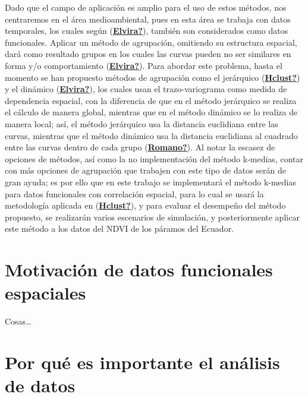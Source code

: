 \documentclass[
]{book}
\begin{document}
Dado que el campo de aplicación es amplio para el uso de estos métodos, nos centraremos en el área medioambiental, pues en esta área se trabaja con datos temporales, los cuales según (\protect\hyperlink{ref-Elvira}{\textbf{Elvira?}}), también son considerados como datos funcionales. Aplicar un método de agrupación, omitiendo su estructura espacial, dará como resultado grupos en los cuales las curvas pueden no ser similares en forma y/o comportamiento (\protect\hyperlink{ref-Elvira}{\textbf{Elvira?}}). Para abordar este problema, hasta el momento se han propuesto métodos de agrupación como el jerárquico (\protect\hyperlink{ref-Hclust}{\textbf{Hclust?}}) y el dinámico (\protect\hyperlink{ref-Elvira}{\textbf{Elvira?}}), los cuales usan el trazo-variograma como medida de dependencia espacial, con la diferencia de que en el método jerárquico se realiza el cálculo de manera global, mientras que en el método dinámico se lo realiza de manera local; así, el método jerárquico usa la distancia euclidiana entre las curvas, mientras que el método dinámico usa la distancia euclidiana al cuadrado entre las curvas dentro de cada grupo (\protect\hyperlink{ref-Romano}{\textbf{Romano?}}). Al notar la escasez de opciones de métodos, así como la no implementación del método k-medias, contar con más opciones de agrupación que trabajen con este tipo de datos serán de gran ayuda; es por ello que en este trabajo se implementará el método k-medias para datos funcionales con correlación espacial, para lo cual se usará la metodología aplicada en (\protect\hyperlink{ref-Hclust}{\textbf{Hclust?}}), y para evaluar el desempeño del método propuesto, se realizarán varios escenarios de simulación, y posteriormente aplicar este método a los datos del NDVI de los páramos del Ecuador.

\hypertarget{motivaciuxf3n-de-datos-funcionales-espaciales}{%
\section{Motivación de datos funcionales espaciales}\label{motivaciuxf3n-de-datos-funcionales-espaciales}}

Cosas\ldots{}

\hypertarget{por-quuxe9-es-importante-el-anuxe1lisis-de-datos}{%
\section{Por qué es importante el análisis de datos}\label{por-quuxe9-es-importante-el-anuxe1lisis-de-datos}}
\end{document}
